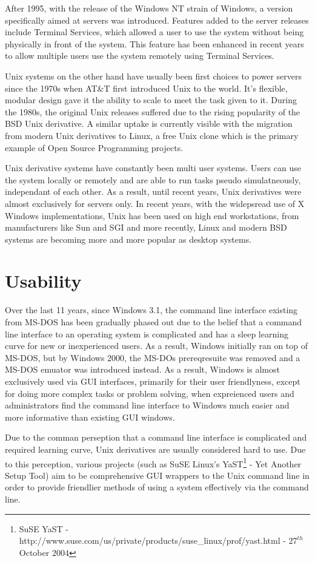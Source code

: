 \documentclass[a4paper,10pt]{article}
\begin{document}
After 1995, with the release of the Windows NT strain of Windows, a
version specifically aimed at servers was introduced. Features added to
the server releases include Terminal Services, which allowed a user
to use the system without being physically in front of the system. This
feature has been enhanced in recent years to allow multiple users use the 
system remotely using Terminal Services.

Unix systems on the other hand have usually been first choices to power
servers since the 1970s when AT\&T first introduced Unix to the world.
It's flexible, modular design gave it the ability to scale to meet the
task given to it. During the 1980s, the original Unix releases suffered
due to the rising popularity of the BSD Unix derivative. A similar
uptake is currently visible with the migration from modern Unix 
derivatives to Linux, a free Unix clone which is the primary example of
Open Source Programming projects.

Unix derivative systems have constantly been multi user systems. Users
can use the system locally or remotely and are able to run tasks pseudo
simulatneously, independant of each other. As a result, until recent
years, Unix derivatives were almost exclusively for servers only. In
recent years, with the widepsread use of X Windows implementations, Unix
has been used on high end workstations, from manufacturers like Sun and
SGI and more recently, Linux and modern BSD systems are becoming more
and more popular as desktop systems.

\section*{Usability}

Over the last 11 years, since Windows 3.1, the command line interface
existing from MS-DOS has been gradually phased out due to the belief
that a command line interface to an operating system is complicated and
has a sleep learning curve for new or inexperienced users. As a result,
Windows initially ran on top of MS-DOS, but by Windows 2000, the MS-DOs
prereqresuite was removed and a MS-DOS emuator was introduced instead.
As a result, Windows is almost exclusively used via GUI interfaces,
primarily for their user friendlyness, except for doing more complex
tasks or problem solving, when expreienced users and administrators find
the command line interface to Windows much easier and more informative
than existing GUI windows.

Due to the comman perseption that a command line interface is
complicated and required learning curve, Unix derivatives are usually
considered hard to use. Due to this perception, various projects
(such as SuSE Linux's YaST\footnote{SuSE YaST -
http://www.suse.com/us/private/products/suse\_linux/prof/yast.html - 
$27^{th}$ October $2004$} - Yet Another Setup Tool) aim to be
comprehensive GUI wrappers to the Unix command line in order to provide
friendlier methods of using a system effectively via the command line.
\end{document}
